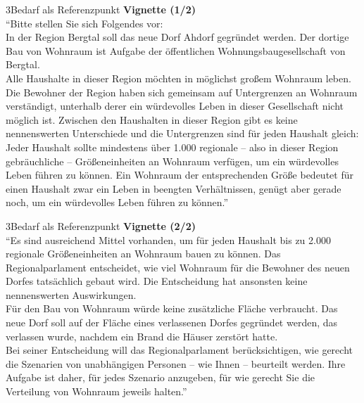 \documentclass[xcolor=table,9pt,aspectratio=169]{beamer}
\begin{document}
\begin{frame}{\vspace*{10mm}3\hspace*{1em}Bedarf als Referenzpunkt}
\textbf{Vignette (1/2)}\\
\medskip
\enquote{Bitte stellen Sie sich Folgendes vor:\\
\medskip
In der Region Bergtal soll das neue Dorf Ahdorf gegründet werden. Der dortige Bau von Wohnraum ist Aufgabe der öffentlichen Wohnungsbaugesellschaft von Bergtal.\\
\medskip
Alle Haushalte in dieser Region möchten in möglichst großem Wohnraum leben. Die Bewohner der Region haben sich gemeinsam auf Untergrenzen an Wohnraum verständigt, unterhalb derer ein würdevolles Leben in dieser Gesellschaft nicht möglich ist. Zwischen den Haushalten in dieser Region gibt es keine nennenswerten Unterschiede und die Untergrenzen sind für jeden Haushalt gleich: Jeder Haushalt sollte mindestens über 1.000 regionale -- also in dieser Region gebräuchliche -- Größeneinheiten an Wohnraum verfügen, um ein würdevolles Leben führen zu können. Ein Wohnraum der entsprechenden Größe bedeutet für einen Haushalt zwar ein Leben in beengten Verhältnissen, genügt aber gerade noch, um ein würdevolles Leben führen zu können.}
\end{frame}


\begin{frame}{\vspace*{10mm}3\hspace*{1em}Bedarf als Referenzpunkt}
\textbf{Vignette (2/2)}\\
\medskip
\enquote{Es sind ausreichend Mittel vorhanden, um für jeden Haushalt bis zu 2.000 regionale Größeneinheiten an Wohnraum bauen zu können. Das Regionalparlament entscheidet, wie viel Wohnraum für die Bewohner des neuen Dorfes tatsächlich gebaut wird. Die Entscheidung hat ansonsten keine nennenswerten Auswirkungen.\\
\medskip
Für den Bau von Wohnraum würde keine zusätzliche Fläche verbraucht. Das neue Dorf soll auf der Fläche eines verlassenen Dorfes gegründet werden, das verlassen wurde, nachdem ein Brand die Häuser zerstört hatte.\\
\medskip
Bei seiner Entscheidung will das Regionalparlament berücksichtigen, wie gerecht die Szenarien von unabhängigen Personen -- wie Ihnen -- beurteilt werden. Ihre Aufgabe ist daher, für jedes Szenario anzugeben, für wie gerecht Sie die Verteilung von Wohnraum jeweils halten.}
\end{frame}
\end{document}
